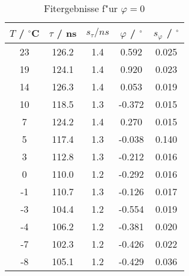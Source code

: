 \begin{table}[H]
\caption{Fitergebnisse f"ur $\varphi=0$}
\begin{center}
\begin{tabular}{|c|c|c|c|c|}
  \hline
  $T$ / ${}^{\circ}$C & $\tau$ / ns & $s_{\tau} / ns$ & $\varphi$ / ${}^{\circ}$ & $s_{\varphi}$ / ${}^{\circ}$ \\ \hline
  23 & 126.2 & 1.4 & 0.592 & 0.025 \\ \hline
  19 & 124.1 & 1.4 & 0.920 & 0.023 \\ \hline
  14 & 126.3 & 1.4 & 0.053 & 0.019 \\ \hline
  10 & 118.5 & 1.3 & -0.372 & 0.015 \\ \hline
  7 & 124.2 & 1.4 & 0.270 & 0.015 \\ \hline
  5 & 117.4 & 1.3 & -0.038 & 0.140 \\ \hline
  3 & 112.8 & 1.3 & -0.212 & 0.016 \\ \hline
  0 & 110.0 & 1.2 & -0.292 & 0.016 \\ \hline
  -1 & 110.7 & 1.3 & -0.126 & 0.017 \\ \hline
  -3 & 104.4 & 1.2 & -0.554 & 0.019 \\ \hline
  -4 & 106.2 & 1.2 & -0.381 & 0.020 \\ \hline
  -7 & 102.3 & 1.2 & -0.426 & 0.022 \\ \hline
  -8 & 105.1 & 1.2 & -0.429 & 0.036 \\ \hline
\end{tabular}
\end{center}
\label{tab:phi:0}
\end{table}
